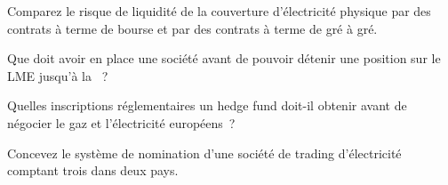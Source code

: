 \begin{interviewq}\label{iq:m3:getting-access-commodities-and-power:3}
Comparez le risque de liquidité de la couverture d'électricité physique par des contrats à terme de bourse et par des contrats à terme de gré à gré.
\end{interviewq}

\begin{interviewq}\label{iq:m3:getting-access-commodities-and-power:4}
Que doit avoir en place une société avant de pouvoir détenir une position sur le LME jusqu'à la ~?
\end{interviewq}

\begin{interviewq}\label{iq:m3:getting-access-commodities-and-power:5}
Quelles inscriptions réglementaires un hedge fund doit-il obtenir avant de négocier le gaz et l'électricité européens~?
\end{interviewq}

\begin{interviewq}\label{iq:m3:getting-access-commodities-and-power:6}
Concevez le système de nomination d'une société de trading d'électricité comptant trois  dans deux pays.
\end{interviewq}
